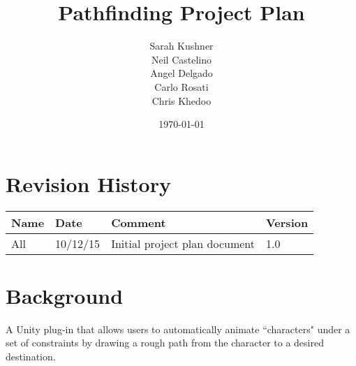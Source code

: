 \documentclass[12pt]{article}
\begin{document}
\title{Pathfinding Project Plan}
\author{Sarah Kushner \\
		Neil Castelino \\
		Angel Delgado \\
		Carlo Rosati \\
		Chris Khedoo}
\date{\today}
\maketitle

\pagebreak

\section{Revision History}
\begin{table}[hp]
\centering
\begin{tabular}{|l|l|l|l|}
\hline
Name 		& Date	 		& 	Comment	 								& 	Version	 \\ \hline
All		& 10/12/15		& 	Initial project plan document			&  	1.0 		 \\ \hline
\end{tabular}
\end{table}

\pagebreak

\section{Background}
\label{sec:back}
A Unity plug-in that allows users to automatically animate ``characters" under a set of constraints by drawing a rough path from the character to a desired destination.
\end{document}
